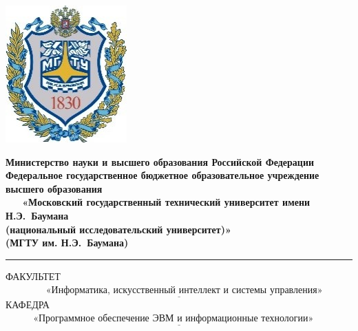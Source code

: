 \documentclass[12pt]{report}
\begin{document}
	\thispagestyle{empty}
	\begin{titlepage}
		\noindent \begin{minipage}{0.15\textwidth}
			\includegraphics[width=\linewidth]{b_logo}
		\end{minipage}
		\noindent\begin{minipage}{0.9\textwidth}\centering
			\textbf{Министерство науки и высшего образования Российской Федерации}\\
			\textbf{Федеральное государственное бюджетное образовательное учреждение высшего образования}\\
			\textbf{~~~«Московский государственный технический университет имени Н.Э.~Баумана}\\
			\textbf{(национальный исследовательский университет)»}\\
			\textbf{(МГТУ им. Н.Э.~Баумана)}
		\end{minipage}
		
		\noindent\rule{18cm}{3pt}
		\newline\newline
		\noindent ФАКУЛЬТЕТ $\underline{~~~~~~~~~~~~~~~~~~~\text{«Информатика, искусственный интеллект и системы управления»}~~~~~~~~~~~~~~~~~~~~~~~~~~~~~~~~~~~~~}$ \newline\newline
		\noindent КАФЕДРА $\underline{~~~~~~~~~~~~~\text{«Программное обеспечение ЭВМ и информационные технологии»}~~~~~~~~~~~~~~~~~~~~~~~}$\newline\newline\newline\newline\newline\newline\newline\newline\newline
		

\end{titlepage}
\end{document}

